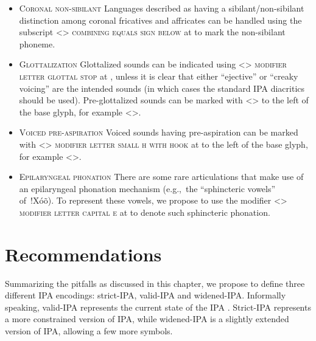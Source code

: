 \begin{itemize}
\item \textsc{Coronal non-sibilant} \newline
      Languages described as having a sibilant/non-sibilant distinction among
      coronal fricatives and affricates can be handled using the subscript
      <> \textsc{combining equals sign below} at  to mark
      the non-sibilant phoneme.
\item \textsc{Glottalization} \newline 
      Glottalized sounds can be indicated using
      <> \textsc{modifier letter glottal stop} at , unless
      it is clear that either ``ejective'' or ``creaky voicing'' are the
      intended sounds (in which cases the standard IPA diacritics should be
      used). Pre-glottalized sounds can be marked with
      <> to the left of the base
      glyph, for example <>.
\item \textsc{Voiced pre-aspiration} \newline Voiced sounds having
      pre-aspiration can be marked with
      <> \textsc{modifier letter
      small h with hook} at  to the left of the base glyph, for
      example <>.
\item \textsc{Epilaryngeal phonation} \newline 
      There are some rare articulations that make
      use of an epilaryngeal phonation mechanism (e.g.,~the “sphincteric vowels”
      of~!Xóõ). To represent these vowels, we propose to use the modifier <>
      \textsc{modifier letter capital e} at  to denote such sphincteric
      phonation.

\end{itemize}


\section{Recommendations}
\label{ipa-recommendations}


Summarizing the pitfalls as discussed in this chapter, we propose to define
three different IPA encodings: strict-IPA, valid-IPA and widened-IPA.\@
Informally speaking, valid-IPA represents the current state of the IPA
\citep{IPA2005}. Strict-IPA represents a more constrained version of IPA, while
widened-IPA is a slightly extended version of IPA, allowing a few more symbols.


